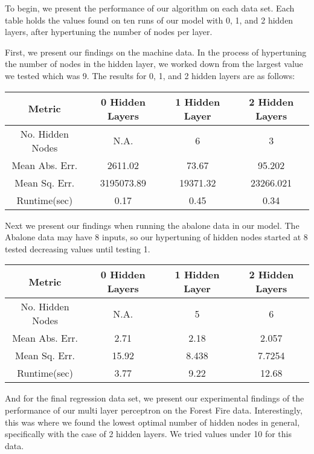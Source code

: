 \documentclass[twoside,11pt]{article}
\begin{document}
To begin, we present the performance of our algorithm on each data set. Each table holds the values found on ten runs of our model with 0, 1, and 2 hidden layers,
after hypertuning the number of nodes per layer.

First, we present our findings on the machine data. In the process of hypertuning the number of nodes in the hidden layer, we worked down from the largest
value we tested which was 9. The results for 0, 1, and 2 hidden layers are as follows: 
\begin{center}
	\begin{tabular}{|c c c c|}
		\hline
		Metric & 0 Hidden Layers & 1 Hidden Layer & 2 Hidden Layers \\ [0.5ex]
		\hline \hline
		No. Hidden Nodes & N.A. & 6 & 3 \\
		\hline
		Mean Abs. Err. & 2611.02 & 73.67 & 95.202 \\
		\hline
		Mean Sq. Err. & 3195073.89 & 19371.32 & 23266.021 \\
		\hline
		Runtime(sec) & 0.17 & 0.45 & 0.34 \\
		\hline
	\end{tabular}
\end{center}

Next we present our findings when running the abalone data in our model. The Abalone data may have 8 inputs, so our hypertuning of
hidden nodes started at 8 tested decreasing values until testing 1.
\begin{center}
	\begin{tabular}{|c c c c|}
		\hline
		Metric & 0 Hidden Layers & 1 Hidden Layer & 2 Hidden Layers \\ [0.5ex]
		\hline \hline
		No. Hidden Nodes & N.A. & 5 & 6 \\
		\hline
		Mean Abs. Err. & 2.71 & 2.18 & 2.057 \\
		\hline
		Mean Sq. Err. & 15.92 & 8.438 & 7.7254 \\
		\hline
		Runtime(sec) & 3.77 & 9.22 & 12.68 \\
		\hline
	\end{tabular}
\end{center}

And for the final regression data set, we present our experimental findings of the performance of our multi layer perceptron
on the Forest Fire data. Interestingly, this was where we found the lowest optimal number of hidden nodes in general, specifically
with the case of 2 hidden layers. We tried values under 10 for this data.
\end{document}
